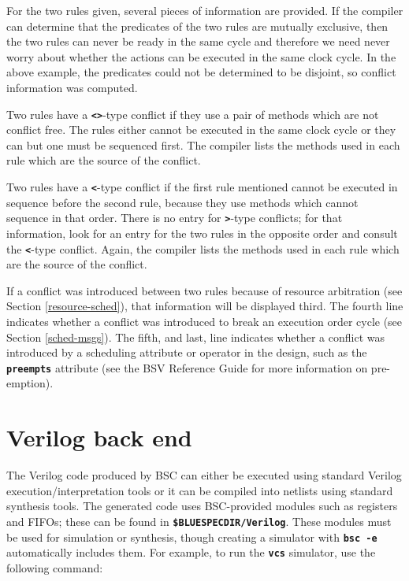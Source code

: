 \documentclass{article}
\newcommand{\te}[1]{\texttt{#1}}
\begin{document}
For the two rules given, several pieces of information are provided.
If the compiler can determine that the predicates of the two rules are
mutually exclusive, then the two rules can never be ready in the same
cycle and therefore we need never worry about whether the actions can
be executed in the same clock cycle.  In the above example, the predicates
could not be determined to be disjoint, so conflict information was
computed.

Two rules have a {\bf\tt <>}-type conflict if they use a pair of
methods which are not conflict free.  The rules either cannot be
executed in the same clock cycle or they can but one must be sequenced
first.  The compiler lists the methods used in each rule which are the
source of the conflict.

Two rules have a {\bf\tt <}-type conflict if the first rule mentioned
cannot be executed in sequence before the second rule, because they
use methods which cannot sequence in that order.  There is no entry
for {\bf\tt >}-type conflicts; for that information, look for an entry
for the two rules in the opposite order and consult the {\bf\tt <}-type
conflict.  Again, the compiler lists the methods used in each rule
which are the source of the conflict.

If a conflict was introduced between two rules because of resource
arbitration (see Section \ref{resource-sched}), that information will
be displayed third.  The fourth line indicates whether a conflict was
introduced to break an execution order cycle (see Section
\ref{sched-msgs}).  The fifth, and last, line indicates whether a
conflict was introduced by a scheduling attribute or operator in the
design, such as the {\bf\tt preempts} attribute (see the
BSV Reference Guide for more information on pre-emption).



\section{Verilog back end}
\label{sec-vl-back-end}
\index{.xcf@\te{.xcf} (synthesis script)}


The Verilog code produced by BSC can either be executed using
standard Verilog execution/interpretation tools or it can be compiled into
netlists using standard synthesis tools.  The generated code uses
BSC-provided modules such as registers and FIFOs; these can be found in
{\bf\tt \$BLUESPECDIR/Verilog}.  These modules must be used for simulation or
synthesis, though creating a simulator with {\bf\tt bsc -e} automatically
includes them.  For example, to run the {\bf\tt vcs} simulator, use the
following command:
\end{document}
